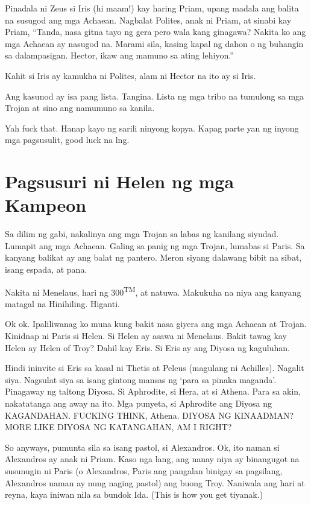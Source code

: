 \documentclass[12pt,letterpaper]{report}
\begin{document}
Pinadala ni Zeus si Iris (hi maam!) kay haring Priam, upang madala ang balita na susugod ang mga Achaean. Nagbalat Polites, anak ni Priam, at sinabi kay Priam, ``Tanda, nasa gitna tayo ng gera pero wala kang ginagawa? Nakita ko ang mga Achaean ay nasugod na. Marami sila, kasing kapal ng dahon o ng buhangin sa dalampasigan. Hector, ikaw ang mamuno sa ating lehiyon.''

Kahit si Iris ay kamukha ni Polites, alam ni Hector na ito ay si Iris.

Ang kasunod ay isa pang lista. Tangina. Lista ng mga tribo na tumulong sa mga Trojan at sino ang namumuno sa kanila.

Yah fuck that. Hanap kayo ng sarili ninyong kopya. Kapag parte yan ng inyong mga pagsusulit, good luck na lng.

\pagebreak
\chapter{Pagsusuri ni Helen ng mga Kampeon} %

Sa dilim ng gabi, nakalinya ang mga Trojan sa labas ng kanilang siyudad. Lumapit ang mga Achaean. Galing sa panig ng mga Trojan, lumabas si Paris. Sa kanyang balikat ay ang balat ng pantero. Meron siyang dalawang bibit na sibat, isang espada, at pana.

Nakita ni Menelaus, hari ng 300\textsuperscript{TM}, at natuwa. Makukuha na niya ang kanyang matagal na Hinihiling. Higanti.

Ok ok. Ipaliliwanag ko muna kung bakit nasa giyera ang mga Achaean at Trojan. Kinidnap ni Paris si Helen. Si Helen ay asawa ni Menelaus. Bakit tawag kay Helen ay Helen of Troy? Dahil kay Eris. Si Eris ay ang Diyosa ng kaguluhan.

Hindi ininvite si Eris sa kasal ni Thetis at Peleus (magulang ni Achilles). Nagalit siya. Nagsulat siya sa isang gintong mansas ng `para sa pinaka maganda'. Pinagaway ng taltong Diyosa. Si Aphrodite, si Hera, at si Athena. Para sa akin, nakatatanga ang away na ito. Mga punyeta, si Aphrodite ang Diyosa ng KAGANDAHAN. FUCKING THINK, Athena. DIYOSA NG KINAADMAN? MORE LIKE DIYOSA NG KATANGAHAN, AM I RIGHT?

So anyways, pumunta sila sa isang pastol, si Alexandros. Ok, ito naman si Alexandros ay anak ni Priam. Kaso nga lang, ang nanay niya ay binangugot na susunugin ni Paris (o Alexandros, Paris ang pangalan binigay sa pagsilang, Alexandros naman ay nung naging pastol) ang buong Troy. Naniwala ang hari at reyna, kaya iniwan nila sa bundok Ida. (This is how you get tiyanak.)
\end{document}
